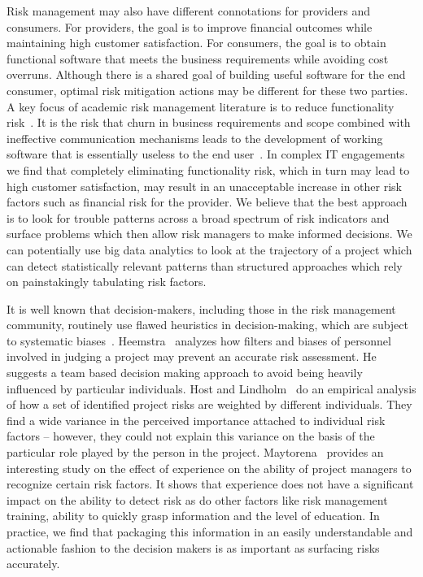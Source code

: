 Risk management may also have different connotations for providers and consumers. For providers, the goal is to improve financial outcomes while maintaining high customer satisfaction. For consumers, the goal is to obtain functional software that meets the business requirements while avoiding cost overruns. Although there is a shared goal of building useful software for the end consumer, optimal risk mitigation actions may be different for these two parties. A key focus of academic risk management literature is to reduce functionality risk~\cite{risk11}.  It is the risk that churn in business requirements and scope combined with ineffective communication mechanisms leads to the development of working software that is essentially useless to the end user~\cite{risk12}. In complex IT engagements we find that completely eliminating functionality risk, which in turn may lead to high customer satisfaction, may result in an unacceptable increase in other risk factors such as financial risk for the provider. We believe that the best approach is to look for trouble patterns across a broad spectrum of risk indicators and surface problems which then allow risk managers to make informed decisions. We can potentially use big data analytics to look at the trajectory of a project which can detect statistically relevant patterns than structured approaches which rely on painstakingly tabulating risk factors.

It is well known that decision-makers, including those in the risk management community, routinely use flawed heuristics in decision-making, which are subject to systematic biases~\cite{risk27}. Heemstra~\cite{risk24} analyzes how filters and biases of personnel involved in judging a project may prevent an accurate risk assessment. He suggests a team based decision making approach to avoid being heavily influenced by particular individuals. Host and Lindholm~\cite{risk25}  do an empirical analysis of how a set of identified project risks are weighted by different individuals. They find a wide variance in the perceived importance attached to individual risk factors -- however, they could not explain this variance on the basis of the particular role played by the person in the project. Maytorena~\cite{risk26} provides an interesting study on the effect of experience on the ability of project managers to recognize certain risk factors. It shows that experience does not have a significant impact on the ability to detect risk as do other factors like risk management training, ability to quickly grasp information and the level of education. In practice, we find that packaging this information in an easily understandable and actionable fashion to the decision makers is as important as surfacing risks accurately.

